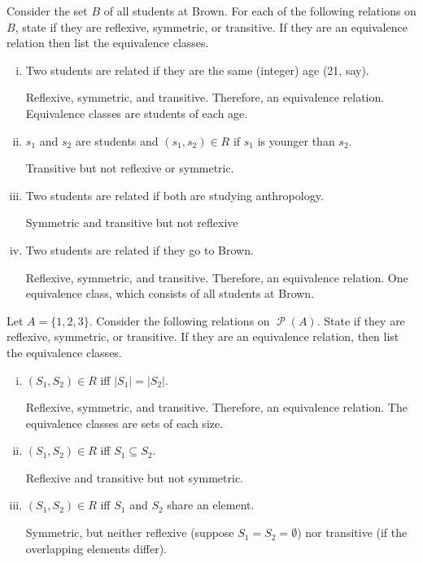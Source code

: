 \documentclass[12pt,letterpaper]{article}
\newcommand\Pow{\ensuremath{\operatorname{\mathcal{P}}}}
\begin{document}
    \begin{mdframed}
            \item Consider the set $B$ of all students at Brown. For each of the following relations on $B$, state if they are reflexive, symmetric, or transitive. If they are an equivalence relation then list the equivalence classes.

        \begin{enumerate}[i.]
            \item Two students are related if they are the same (integer) age (21, say).


            Reflexive, symmetric, and transitive. Therefore, an equivalence relation. Equivalence classes are students of each age.

            \item$s_1$ and $s_2$ are students and $(s_1,s_2) \in R$ if $s_1$ is younger than $s_2$.

            Transitive but not reflexive or symmetric.

        \item Two students are related if both are studying anthropology.
        
                Symmetric and transitive but not reflexive


        \item Two students are related if they go to Brown.


            Reflexive, symmetric, and transitive. Therefore, an equivalence relation. One equivalence class, which consists of all students at Brown.
    
        \end{enumerate}

        \item Let $A = \{1,2,3\}$. Consider the following relations on $\Pow{(A)}$. State if they are reflexive, symmetric, or transitive. If they are an equivalence relation, then list the equivalence classes.

        \begin{enumerate}[i.]
            \item $(S_1,S_2) \in R$ iff $|S_1| = |S_2|$.

            Reflexive, symmetric, and transitive. Therefore, an equivalence relation. The equivalence classes are sets of each size.

            \item $(S_1,S_2) \in R$ iff $S_1 \subseteq S_2$.

            Reflexive and transitive but not symmetric. 

            \item $(S_1,S_2) \in R$ iff $S_1$ and $S_2$ share an element.


            Symmetric, but neither reflexive (suppose $S_1 = S_2 = \emptyset$) nor transitive (if the overlapping elements differ).
    
        \end{enumerate}

    \end{mdframed}
\end{document}
